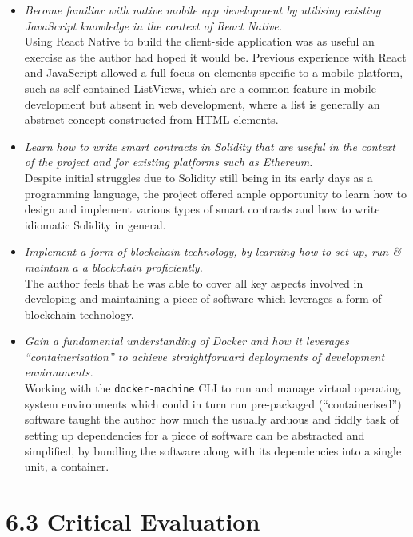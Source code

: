 \begin{itemize}
\item
  \emph{Become familiar with native mobile app development by utilising
  existing JavaScript knowledge in the context of React Native.}\\
  Using React Native to build the client-side application was as useful
  an exercise as the author had hoped it would be. Previous experience
  with React and JavaScript allowed a full focus on elements specific to
  a mobile platform, such as self-contained ListViews, which are a
  common feature in mobile development but absent in web development,
  where a list is generally an abstract concept constructed from HTML
  elements.
\item
  \emph{Learn how to write smart contracts in Solidity that are useful
  in the context of the project and for existing platforms such as
  Ethereum.}\\
  Despite initial struggles due to Solidity still being in its early
  days as a programming language, the project offered ample opportunity
  to learn how to design and implement various types of smart contracts
  and how to write idiomatic Solidity in general.
\item
  \emph{Implement a form of blockchain technology, by learning how to
  set up, run \& maintain a a blockchain proficiently.}\\
  The author feels that he was able to cover all key aspects involved in
  developing and maintaining a piece of software which leverages a form
  of blockchain technology.
\item
  \emph{Gain a fundamental understanding of Docker and how it leverages
  ``containerisation'' to achieve straightforward deployments of
  development environments.}\\
  Working with the \texttt{docker-machine} CLI to run and manage virtual
  operating system environments which could in turn run pre-packaged
  (``containerised'') software taught the author how much the usually
  arduous and fiddly task of setting up dependencies for a piece of
  software can be abstracted and simplified, by bundling the software
  along with its dependencies into a single unit, a container.
\end{itemize}

\section{6.3 Critical Evaluation}\label{critical-evaluation}

